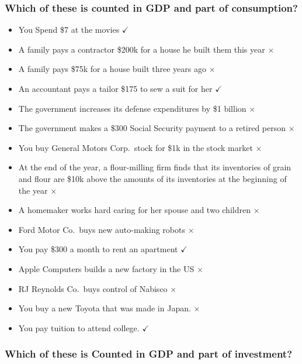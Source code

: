 \documentclass[
  letterpaper,
  DIV=11,
  numbers=noendperiod]{scrartcl}
\providecommand{\tightlist}{%
  \setlength{\itemsep}{0pt}\setlength{\parskip}{0pt}}\usepackage{longtable,booktabs,array}
\begin{document}
\hypertarget{which-of-these-is-counted-in-gdp-and-part-of-consumption}{%
\subsubsection{Which of these is counted in GDP and part of
consumption?}\label{which-of-these-is-counted-in-gdp-and-part-of-consumption}}

\begin{itemize}
\tightlist
\item
  You Spend \$7 at the movies \(\checkmark\)
\item
  A family pays a contractor \$200k for a house he built them this year
  \(\times\)
\item
  A family pays \$75k for a house built three years ago \(\times\)
\item
  An accountant pays a tailor \$175 to sew a suit for her \(\checkmark\)
\item
  The government increases its defense expenditures by \$1 billion
  \(\times\)
\item
  The government makes a \$300 Social Security payment to a retired
  person \(\times\)
\item
  You buy General Motors Corp.~stock for \$1k in the stock market
  \(\times\)
\item
  At the end of the year, a flour-milling firm finds that its
  inventories of grain and flour are \$10k above the amounts of its
  inventories at the beginning of the year \(\times\)
\item
  A homemaker works hard caring for her spouse and two children
  \(\times\)
\item
  Ford Motor Co.~buys new auto-making robots \(\times\)
\item
  You pay \$300 a month to rent an apartment \(\checkmark\)
\item
  Apple Computers builds a new factory in the US \(\times\)
\item
  RJ Reynolds Co.~buys control of Nabisco \(\times\)
\item
  You buy a new Toyota that was made in Japan. \(\times\)
\item
  You pay tuition to attend college. \(\checkmark\)
\end{itemize}

\hypertarget{which-of-these-is-counted-in-gdp-and-part-of-investment}{%
\subsubsection{Which of these is Counted in GDP and part of
investment?}\label{which-of-these-is-counted-in-gdp-and-part-of-investment}}
\end{document}
